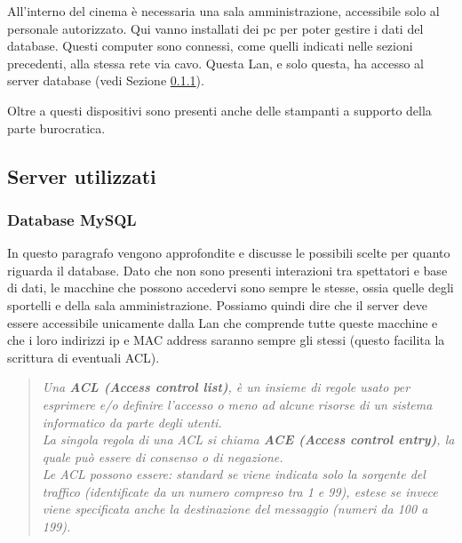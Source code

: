\documentclass{article}
\begin{document}
All'interno del cinema è necessaria una sala amministrazione, accessibile solo al personale autorizzato. Qui vanno installati dei pc per poter gestire i dati del database.
Questi computer sono connessi, come quelli indicati nelle sezioni precedenti, alla stessa rete via cavo. Questa Lan, e solo questa, ha accesso al server database (vedi Sezione \ref{sec:MySQL}).

Oltre a questi dispositivi sono presenti anche delle stampanti a supporto della parte burocratica.

\subsection{Server utilizzati}\label{sec:Database}

\subsubsection{Database MySQL}\label{sec:MySQL}
In questo paragrafo vengono approfondite e discusse le possibili scelte per quanto riguarda il database.
Dato che non sono presenti interazioni tra spettatori e base di dati, le macchine che possono accedervi sono sempre le stesse, ossia quelle degli sportelli e della sala amministrazione. Possiamo quindi dire che il server deve essere accessibile unicamente dalla Lan che comprende tutte queste macchine e che i loro indirizzi ip e MAC address saranno sempre gli stessi (questo facilita la scrittura di eventuali ACL).
\begin{quote}
\begin{Cit}
\textit{
Una \textbf{ACL (Access control list)}, è un insieme di regole usato per esprimere e/o definire l'accesso o meno ad alcune risorse di un sistema informatico da parte degli utenti.\\
La singola regola di una ACL si chiama \textbf{ACE (Access control entry)}, la quale può essere di consenso o di negazione.\\
Le ACL possono essere: standard se viene indicata solo la sorgente del traffico (identificate da un numero compreso tra 1 e 99), estese se invece viene specificata anche la destinazione del messaggio (numeri da 100 a 199).}
\end{Cit}
\end{quote}
\end{document}
